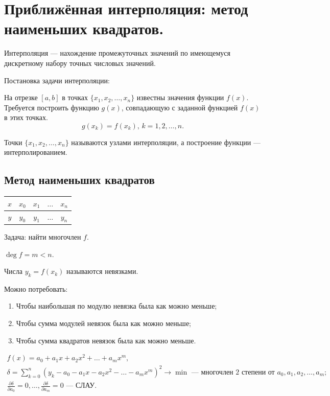 \section{Приближённая интерполяция: метод наименьших квадратов.}

Интерполяция --- нахождение промежуточных значений по имеющемуся дискретному набору точных числовых значений. 

Постановка задачи интерполяции:

На отрезке $[a, b]$ в точках $\{x_1, x_2, \dotsc, x_n\}$ известны значения функции $f(x)$. Требуется построить функцию $g(x)$, совпадающую с заданной функцией $f(x)$ в этих точках.
\begin{equation*}
	g(x_k) = f(x_k), \, k = 1, 2, \dotsc, n.
\end{equation*}

Точки $\{x_1, x_2, \dotsc, x_n\}$ называются узлами интерполяции, а построение функции --- интерполированием. 

\subsection*{Метод наименьших квадратов}

\begin{table}[H]
	\centering
	\begin{tabular}{|c|c|c|c|c|}
		\hline
		{$x$} & {$x_0$} & {$x_1$} & {$\dotsc$} & {$x_n$} \\ \hline 
		{$y$} & {$y_0$} & {$y_1$} & {$\dotsc$} & {$y_n$} \\ \hline 
	\end{tabular}
\end{table}

Задача: найти многочлен $f$.

$\deg{f} = m < n$.

Числа $y_k = f(x_k)$ называются невязками. 

Можно потребовать:
\begin{enumerate}
	\item Чтобы наибольшая по модулю невязка была как можно меньше;
	
	\item Чтобы сумма модулей невязок была как можно меньше;
	
	\item Чтобы сумма квадратов невязок была как можно меньше.
\end{enumerate}
\begin{gather*}
	f(x) = a_0 + a_1 x + a_2 x^2 + \dotsc + a_m x^m, \\
	\delta = \sum\limits_{k = 0}^{n}(y_{k} - a_0 - a_1 x - a_2 x^2 - \dotsc - a_m x^m)^2 \to \min \text{ --- многочлен 2 степени от } a_0, a_1, a_2, \dotsc, a_m; \\
	\frac{\partial \delta}{\partial a_0} = 0, \dotsc, \frac{\partial \delta}{\partial a_m} = 0 \text{ --- СЛАУ}.
\end{gather*}

